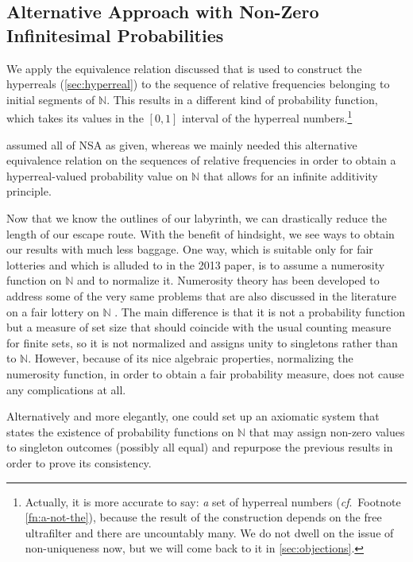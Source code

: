 \subsection{Alternative Approach with Non-Zero Infinitesimal Probabilities}\label{sec:alternative}
We apply the equivalence relation discussed that is used to construct the hyperreals (\autoref{sec:hyperreal}) to the sequence of relative frequencies belonging to initial segments of $\mathbb{N}$. This results in a different kind of probability function, which takes its values in the $[0,1]$ interval of the hyperreal numbers.\footnote{Actually, it is more accurate to say: \emph{a} set of hyperreal numbers (\textit{cf}.\ Footnote \ref{fn:a-not-the}), because the result of the construction depends on the free ultrafilter and there are uncountably many. We do not dwell on the issue of non-uniqueness now, but we will come back to it in \autoref{sec:objections}.}

\citet{WenmackersHorsten:2013} assumed all of NSA as given, whereas we mainly needed this alternative equivalence relation on the sequences of relative frequencies in order to obtain a hyperreal-valued probability value on $\mathbb{N}$ that allows for an infinite additivity principle.

Now that we know the outlines of our labyrinth, we can drastically reduce the length of our escape route.
With the benefit of hindsight, we see ways to obtain our results with much less baggage. One way, which is suitable only for fair lotteries and which is alluded to in the 2013 paper, is to assume a numerosity function on $\mathbb{N}$ and to normalize it. Numerosity theory has been developed to address some of the very same problems that are also discussed in the literature on a fair lottery on $\mathbb{N}$ \citep{BenciDiNasso:2003b,Mancosu:2009}. The main difference is that it is not a probability function but a measure of set size that should coincide with the usual counting measure for finite sets, so it is not normalized and assigns unity to singletons rather than to $\mathbb{N}$. However, because of its nice algebraic properties, normalizing the numerosity function, in order to obtain a fair probability measure, does not cause any complications at all.

Alternatively and more elegantly, one could set up an axiomatic system that states the existence of probability functions on $\mathbb{N}$ that may assign non-zero values to singleton outcomes (possibly all equal) and repurpose the previous results in order to prove its consistency.

